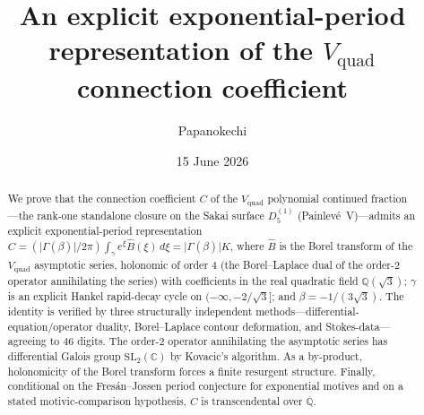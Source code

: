 \documentclass[11pt,reqno]{amsart}
\title[An exponential-period representation of the $V_{\mathrm{quad}}$ constant]%
{An explicit exponential-period representation of the $V_{\mathrm{quad}}$ connection coefficient}
\author{Papanokechi}
\date{15 June 2026}
\renewcommand{\_}{\vquadorigunderscore\allowbreak}
\theoremstyle{plain}
\theoremstyle{definition}
\newcommand{\Vquad}{V_{\mathrm{quad}}}
\newcommand{\Bhat}{\widehat{B}}
\newcommand{\Qsqrt}{\mathbb{Q}(\sqrt3)}
\newcommand{\Qbar}{\overline{\mathbb{Q}}}
\newcommand{\SL}{\mathrm{SL}}
\begin{document}
\begin{abstract}
We prove that the connection coefficient $C$ of the $\Vquad$ polynomial continued fraction---the
rank-one standalone closure on the Sakai surface $D_5^{(1)}$ (Painlev\'e~V)---admits an explicit
exponential-period representation
$C=(\lvert\Gamma(\beta)\rvert/2\pi)\int_\gamma e^{\xi}\Bhat(\xi)\,d\xi=\lvert\Gamma(\beta)\rvert K$,
where $\Bhat$ is the Borel transform of the $\Vquad$ asymptotic series, holonomic of order $4$
(the Borel--Laplace dual of the order-$2$ operator annihilating the series)
with coefficients in the real quadratic field $\Qsqrt$; $\gamma$ is an explicit Hankel
rapid-decay cycle on $(-\infty,-2/\sqrt3]$; and $\beta=-1/(3\sqrt3)$. The identity is verified by
three structurally independent methods---differential-equation/operator duality, Borel--Laplace
contour deformation, and Stokes-data---agreeing to $46$ digits. The order-$2$ operator annihilating
the asymptotic series has differential Galois group $\SL_2(\mathbb{C})$ by Kovacic's algorithm.
As a by-product, holonomicity of the Borel transform forces a finite resurgent structure. Finally,
conditional on the Fres\'an--Jossen period conjecture for exponential motives and on a stated
motivic-comparison hypothesis, $C$ is transcendental over $\Qbar$.
\end{abstract}
\maketitle
\end{document}

